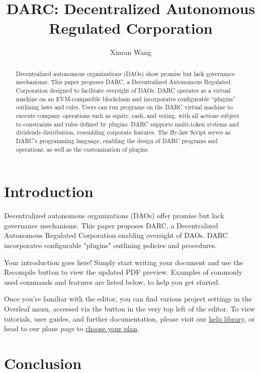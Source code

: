 \documentclass{article}
\title{DARC: Decentralized Autonomous Regulated Corporation}
\author{Xinran Wang}
\begin{document}
\maketitle

\begin{abstract}
Decentralized autonomous organizations (DAOs) show promise but lack governance mechanisms. This paper proposes DARC, a Decentralized Autonomous Regulated Corporation designed to facilitate oversight of DAOs. DARC operates as a virtual machine on an EVM-compatible blockchain and incorporates configurable ``plugins'' outlining laws and rules. Users can run programs on the DARC virtual machine to execute company operations such as equity, cash, and voting, with all actions subject to constraints and rules defined by plugins. DARC supports multi-token systems and dividends distribution, resembling corporate features. The By-law Script serves as DARC's programming language, enabling the design of DARC programs and operations, as well as the customization of plugins.
\end{abstract}

\section{Introduction}


Decentralized autonomous organizations (DAOs) offer promise but lack governance mechanisms. This paper proposes DARC, a Decentralized Autonomous Regulated Corporation enabling oversight of DAOs. DARC incorporates configurable "plugins" outlining policies and procedures. 

Your introduction goes here! Simply start writing your document and use the Recompile button to view the updated PDF preview. Examples of commonly used commands and features are listed below, to help you get started.

Once you're familiar with the editor, you can find various project settings in the Overleaf menu, accessed via the button in the very top left of the editor. To view tutorials, user guides, and further documentation, please visit our \href{https://www.overleaf.com/learn}{help library}, or head to our plans page to \href{https://www.overleaf.com/user/subscription/plans}{choose your plan}.
































\section{Conclusion}






\end{document}
